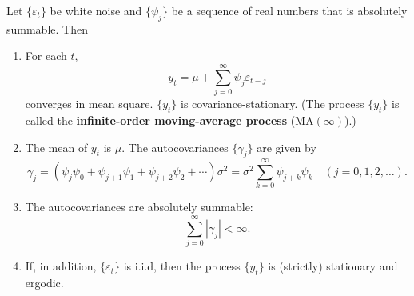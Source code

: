 \begin{proposition}
\label{prop:6.1}
Let $\{\varepsilon_t\}$ be white noise and $\{\psi_j\}$ be a sequence of real numbers that is
absolutely summable. Then
\begin{enumerate}[label=(\alph*)]
\item For each $t$,
\begin{equation}
  y_t = \mu + \sum_{j=0}^{\infty} \psi_j \varepsilon_{t-j}
  \label{eq:6.1.6}
\end{equation}
converges in mean square. $\{y_t\}$ is covariance-stationary. (The process $\{y_t\}$ is
called the \textbf{infinite-order moving-average process} ($\mathrm{MA}(\infty)$).)

\item The mean of $y_t$ is $\mu$. The autocovariances $\{\gamma_j\}$ are given by
\begin{equation}
  \gamma_j = (\psi_j \psi_0 + \psi_{j+1} \psi_1 + \psi_{j+2} \psi_2 + \cdots) \sigma^2
         = \sigma^2 \sum_{k=0}^{\infty} \psi_{j+k} \psi_k
         \quad (j = 0, 1, 2, \ldots).
  \label{eq:6.1.7}
\end{equation}

\item The autocovariances are absolutely summable:
\begin{equation}
  \sum_{j=0}^{\infty} |\gamma_j| < \infty.
  \label{eq:6.1.8}
\end{equation}

\item If, in addition, $\{\varepsilon_t\}$ is i.i.d, then the process $\{y_t\}$ is (strictly) stationary and
ergodic.
\end{enumerate}
\end{proposition}

